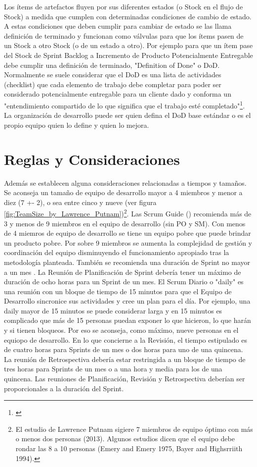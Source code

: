 Los ítems de artefactos fluyen por sus diferentes estados (o Stock en el flujo de Stock) a medida que cumplen con determinadas condiciones de cambio de estado. A estas condiciones que deben cumplir para cambiar de estado se las llama definición de terminado y funcionan como válvulas para que los ítems pasen de un Stock a otro Stock (o de un estado a otro). Por ejemplo para que un ítem pase del Stock de Sprint Backlog a Incremento de Producto Potencialmente Entregable debe cumplir una definición de terminado, "Definition of Done" o DoD. Normalmente se suele considerar que el DoD es una lista de actividades (checklist) que cada elemento de trabajo debe completar para poder ser considerado potencialmente entregable para un cliente dado y conforma un "entendimiento compartido de lo que significa que el trabajo esté completado"\footnote{\cite{Ken-Jeff-2013}}. La organización de desarrollo puede ser quien defina el DoD base estándar o es el propio equipo quien lo define y quien lo mejora.

\section{Reglas y Consideraciones}

Además se establecen alguna consideraciones relacionadas a tiempos y tamaños. Se aconseja un tamaño de equipo de desarrollo mayor a 4 miembros y menor a diez (7 +- 2), o sea entre cinco y nueve (ver figura \ref{fig:TeamSize_by_Lawrence_Putnam})\footnote{El estudio de Lawrence Putnam sigiere 7 miembros de equipo óptimo con más o menos dos personas (2013). Algunos estudios dicen que el equipo debe rondar las 8 a 10 personas (Emery and Emery 1975, Bayer and Highsrriith 1994).}. Las Scrum Guide (\cite{Ken-Jeff-2017}) recomienda más de 3 y menos de 9 miembros en el equipo de desarrollo (sin PO y SM). Con menos de 4 miemros de equipo de desarrollo se tiene un equipo pobre que puede brindar un producto pobre. Por sobre 9 miembros se aumenta la complejidad de gestión y coordinación del equipo disminuyendo el funcionamiento apropiado tras la metodología planteada. También se recomienda una duración de Sprint no mayor a un mes \cite{Ken-Jeff-2017}. La Reunión de Planificación de Sprint debería tener un máximo de duración de ocho horas para un Sprint de un mes. El Scrum Diario o "daily" es una reunión con un bloque de tiempo de 15 minutos para que el Equipo de Desarrollo sincronice sus actividades y cree un plan para el día. Por ejemplo, una daily mayor de 15 minutos se puede considerar larga y en 15 minutos es complicado que más de 15 personas puedan exponer lo que hicieron, lo que harán y si tienen bloqueos. Por eso se aconseja, como máximo, nueve personas en el equiopo de desarrollo. En lo que concierne a la Revisión, el tiempo estipulado es de cuatro horas para Sprints de un mes o dos horas para uno de una quincena. La reunión de Retrospectiva  debería estar restringida a un bloque de tiempo de tres horas para Sprints de un mes o a una hora y media para los de una quincena. Las reuniones de Planificación, Revisión y Retrospectiva deberían ser proporcionales a la duración del Sprint.

